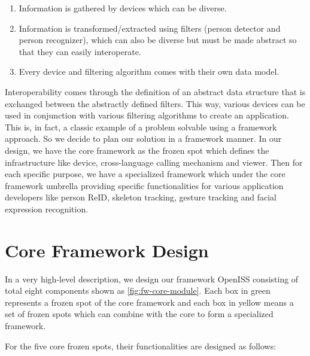 \begin{enumerate}
    \item Information is gathered by devices which can be diverse.
    \item Information is transformed/extracted using filters (person detector 
    and person recognizer), which can also be diverse but must be made abstract 
    so that they can easily interoperate.
    \item Every device and filtering algorithm comes with their own data model.
\end{enumerate}

Interoperability comes through the definition of an abstract data
structure that is exchanged between the abstractly defined filters. This way,
various devices can be used in conjunction with various filtering algorithms to
create an application. This is, in fact, a classic example of a problem solvable
using a framework approach.
So we decide to plan our solution in a framework manner.
In our design, we have the core framework as the frozen spot which
defines the infrastructure like device, cross-language calling mechanism and
viewer.
Then for each specific purpose, we have a specialized framework which under the
core framework umbrella providing specific functionalities for various
application developers like person ReID, skeleton tracking, gesture tracking
and facial expression recognition.

\section{Core Framework Design}
\label{sec:fw-design-core}

In a very high-level description, we design our framework OpenISS consisting of
total eight components shown as \autoref{fig:fw-core-module}. Each box in
green represents a frozen spot of the core framework and each box in yellow
means a set of frozen spots which can combine with the core to form a
specialized framework.

For the five core frozen spots, their functionalities are designed as follows:

